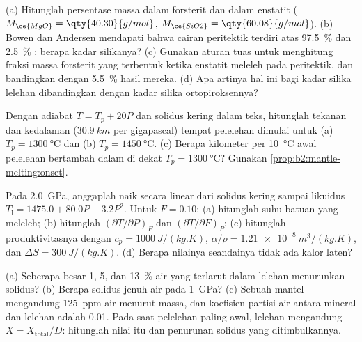 \begin{exercise}[$\star\star$]\label{exo:b2:mantle-melting:6}
(a) Hitunglah persentase massa  dalam forsterit  dan dalam
enstatit  ($M_{\ce{MgO}} = \qty{40.30}{g/mol}$, $M_{\ce{SiO2}} =
\qty{60.08}{g/mol}$). (b) Bowen dan Andersen mendapati bahwa cairan peritektik terdiri atas
\qty{97.5}{\percent}  dan \qty{2.5}{\percent} : berapa kadar
silikanya? (c) Gunakan aturan tuas untuk menghitung fraksi massa forsterit yang
terbentuk ketika enstatit meleleh pada peritektik, dan bandingkan dengan
\qty{5.5}{\percent} hasil mereka. (d) Apa artinya hal ini bagi kadar silika lelehan
 dibandingkan dengan kadar silika ortopiroksennya?
\end{exercise}

\begin{exercise}[$\star\star$]\label{exo:b2:mantle-melting:7}
Dengan adiabat $T = T_p + 20P$ dan solidus kering dalam teks, hitunglah
tekanan dan kedalaman ($\qty{30.9}{km}$ per gigapascal) tempat pelelehan dimulai
untuk (a) $T_p = \qty{1300}{\celsius}$ dan (b) $T_p = \qty{1450}{\celsius}$. (c) Berapa
kilometer per \qty{10}{\celsius} awal pelelehan bertambah dalam di dekat
$T_p = \qty{1300}{\celsius}$? Gunakan \cref{prop:b2:mantle-melting:onset}.
\end{exercise}

\begin{exercise}[$\star\star$]\label{exo:b2:mantle-melting:8}
Pada \qty{2.0}{GPa}, anggaplah  naik secara linear dari solidus kering sampai
likuidus  $T_{\mathrm l} = 1475.0 + 80.0P - 3.2P^2$. Untuk $F = 0.10$:
(a) hitunglah suhu batuan yang meleleh; (b) hitunglah $(\partial
T/\partial P)_F$ dan $(\partial T/\partial F)_P$; (c) hitunglah produktivitasnya dengan
$c_p = \qty{1000}{J/(kg.K)}$, $\alpha/\rho = \qty{1.21e-8}{m^3/(kg.K)}$, dan
$\Delta S = \qty{300}{J/(kg.K)}$. (d) Berapa nilainya seandainya tidak ada kalor laten?
\end{exercise}

\begin{exercise}[$\star\star$]\label{exo:b2:mantle-melting:9}
(a) Seberapa besar 1, 5, dan \qty{13}{\percent} air yang terlarut dalam lelehan menurunkan
solidus? (b) Berapa solidus jenuh air pada \qty{1}{GPa}? (c) Sebuah mantel
mengandung \qty{125}{ppm} air menurut massa, dan koefisien partisi air antara
mineral dan lelehan adalah 0.01. Pada saat pelelehan paling awal, lelehan mengandung $X =
X_{\text{total}}/D$: hitunglah nilai itu dan penurunan solidus yang ditimbulkannya.
\end{exercise}

